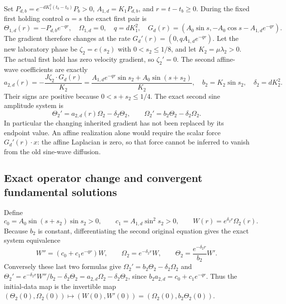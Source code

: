 Set $P_{d,b}=e^{-dK_1^2(t_b-t_0)}P_b>0$,
$A_{1,d}=K_1P_{d,b}$, and $r=t-t_b\geq0$.
During the fixed first holding control $\alpha=s$ the exact first
pair is
\[
 \Theta_{1,d}(r)=-P_{d,b}e^{-qr},\quad\Omega_{1,d}=0,
 \quad q=dK_1^2,
 \quad G_d(r)=(A_0\sin s,-A_0\cos s-A_{1,d}e^{-qr}).
\]
The gradient therefore changes at the rate
$G_d'(r)=(0,qA_{1,d}e^{-qr})$.
Let the new laboratory phase be $\zeta_2=e(s_2)$ with
$0<s_2\leq1/8$, and let $K_2=\mu\lambda_2>0$.
The actual first hold has zero velocity gradient, so $\zeta_2'=0$.
The second affine-wave coefficients are exactly
\begin{equation}
 a_{2,d}(r)=-\frac{J\zeta_2\cdot G_d(r)}{K_2}
 =\frac{A_{1,d}e^{-qr}\sin s_2+A_0\sin(s+s_2)}{K_2},\quad
 b_2=K_2\sin s_2,\quad\delta_2=dK_2^2.
 \label{eq:cv-feedback-coefficients}
\end{equation}
Their signs are positive because $0<s+s_2\leq1/4$.
The exact second sine amplitude system is
\begin{equation}
 \Theta_2'=a_{2,d}(r)\Omega_2-\delta_2\Theta_2,
 \qquad\Omega_2'=b_2\Theta_2-\delta_2\Omega_2.
 \label{eq:cv-feedback-pair}
\end{equation}
In particular the changing inherited gradient has not been replaced
by its endpoint value. An affine realization alone would require the
scalar force $G_d'(r)\cdot x$: the affine Laplacian is zero, so that
force cannot be inferred to vanish from the old sine-wave diffusion.

\subsection{Exact operator change and convergent fundamental solutions}

Define
\[
 c_0=A_0\sin(s+s_2)\sin s_2>0,\qquad
 c_1=A_{1,d}\sin^2s_2>0,\qquad W(r)=e^{\delta_2r}\Omega_2(r).
\]
Because $b_2$ is constant, differentiating the second original
equation gives the exact system equivalence
\begin{equation}
 W''=(c_0+c_1e^{-qr})W,\qquad
 \Omega_2=e^{-\delta_2r}W,\qquad
 \Theta_2=\frac{e^{-\delta_2r}}{b_2}W'.
 \label{eq:cv-feedback-scalar-map}
\end{equation}
Conversely these last two formulas give
$\Omega_2'=b_2\Theta_2-\delta_2\Omega_2$ and
$\Theta_2'=e^{-\delta_2r}W''/b_2-\delta_2\Theta_2
=a_{2,d}\Omega_2-\delta_2\Theta_2$, since
$b_2a_{2,d}=c_0+c_1e^{-qr}$.
Thus the initial-data map is the invertible map
$(\Theta_2(0),\Omega_2(0))\mapsto(W(0),W'(0))
=(\Omega_2(0),b_2\Theta_2(0))$.

